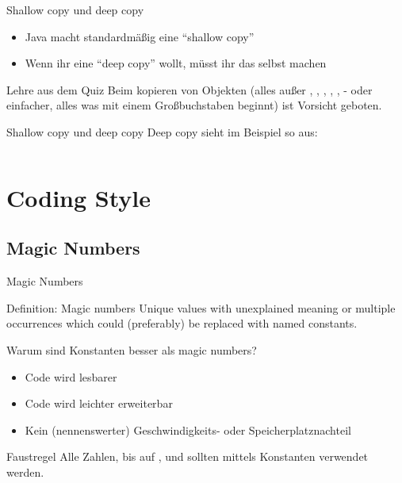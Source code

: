 \documentclass[usepdftitle=false,hyperref={pdfpagelabels=false}]{beamer}
\begin{document}
\begin{frame}{Shallow copy und deep copy}
    \begin{itemize}
        \item Java macht standardmäßig eine "`shallow copy"'
        \item Wenn ihr eine "`deep copy"' wollt, müsst ihr das selbst machen
    \end{itemize}
    \begin{alertblock}{Lehre aus dem Quiz}
        Beim kopieren von Objekten (alles außer , ,
        , , ,  -
        oder einfacher, alles was mit einem Großbuchstaben beginnt)
        ist Vorsicht geboten.
    \end{alertblock}
\end{frame}

\begin{frame}{Shallow copy und deep copy}
    Deep copy sieht im Beispiel so aus:
    \inputminted[linenos=true, numbersep=5pt, tabsize=4, fontsize=\tiny, label=QuizArray.java, frame=lines]{java}{QuizArray-solution.java}
\end{frame}

\section{Coding Style}
\subsection{Magic Numbers}
\begin{frame}{Magic Numbers}
    \begin{alertblock}{Definition: Magic numbers}
        Unique values with unexplained meaning or multiple occurrences
        which could (preferably) be replaced with named constants.
    \end{alertblock}

    Warum sind Konstanten besser als magic numbers?
    \begin{itemize}
        \item Code wird lesbarer
        \item Code wird leichter erweiterbar
        \item Kein (nennenswerter) Geschwindigkeits- oder Speicherplatznachteil
    \end{itemize}

    \begin{block}{Faustregel}
        Alle Zahlen, bis auf ,  und 
        sollten mittels Konstanten verwendet werden.
    \end{block}
\end{frame}
\end{document}
